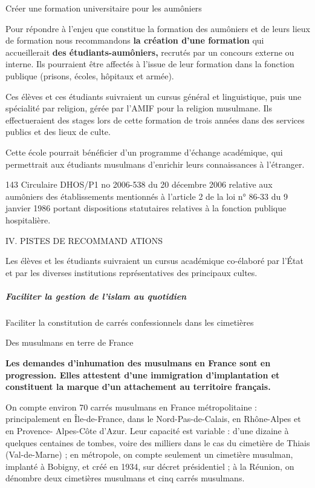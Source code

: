 Créer une formation universitaire pour les aumôniers


Pour répondre à l'enjeu que constitue la formation des aumôniers et de
leurs lieux de formation nous recommandons \textbf{la création d'une
formation} qui accueillerait \textbf{des étudiants-aumôniers,} recrutés
par un concours externe ou interne. Ils pourraient être affectés à
l'issue de leur formation dans la fonction publique (prisons, écoles,
hôpitaux et armée).

Ces élèves et ces étudiants suivraient un cursus général et
linguistique, puis une spécialité par religion, gérée par l'AMIF pour la
religion musulmane. Ils effectueraient des stages lors de cette
formation de trois années dans des services publics et des lieux de
culte.

Cette école pourrait bénéficier d'un programme d'échange académique, qui
permettrait aux étudiants musulmans d'enrichir leurs connaissances à
l'étranger.

143 Circulaire DHOS/P1 no 2006-538 du 20 décembre 2006 relative aux
aumôniers des établissements mentionnés à l'article 2 de la loi n° 86-33
du 9 janvier 1986 portant dispositions statutaires relatives à la
fonction publique hospitalière.

IV. PISTES DE RECOMMAND ATIONS

Les élèves et les étudiants suivraient un cursus académique co-élaboré
par l'État et par les diverses institutions représentatives des
principaux cultes.


\hypertarget{faciliter-la-gestion-de-lislam-au-quotidien}{%
\subparagraph{Faciliter la gestion de l'islam au
quotidien}\label{faciliter-la-gestion-de-lislam-au-quotidien}}

Faciliter la constitution de carrés confessionnels dans les cimetières

Des musulmans en terre de France


\textbf{Les demandes d'inhumation des musulmans en France sont en
progression. Elles attestent d'une immigration d'implantation et
constituent la marque d'un attachement au territoire français.}

On compte environ 70 carrés musulmans en France métropolitaine :
principalement en Île-de-France, dans le Nord-Pas-de-Calais, en
Rhône-Alpes et en Provence- Alpes-Côte d'Azur. Leur capacité est
variable : d'une dizaine à quelques centaines de tombes, voire des
milliers dans le cas du cimetière de Thiais (Val-de-Marne) ; en
métropole, on compte seulement un cimetière musulman, implanté à
Bobigny, et créé en 1934, sur décret présidentiel ; à la Réunion, on
dénombre deux cimetières musulmans et cinq carrés musulmans.

